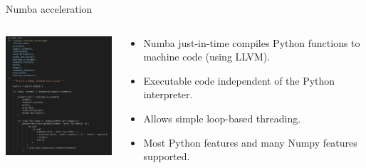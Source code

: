\documentclass[dvipsnames,10pt]{beamer}
\begin{document}
\begin{frame}[fragile]{Numba acceleration}

\begin{columns}[T]
\begin{column}{.48\textwidth}
\begin{center}
\includegraphics[width=6cm]{../figs/grid_fun_discretise.png}
\end{center}
\end{column}%
\hfill%
\begin{column}{.48\textwidth}

\vspace{1cm}

\begin{itemize}
    \item Numba just-in-time compiles Python functions to machine code (using LLVM).
    \item Executable code independent of the Python interpreter.
    \item Allows simple loop-based threading.
    \item Most Python features and many Numpy features supported.
\end{itemize}

\end{column}%
\end{columns}

\end{frame}
\end{document}
